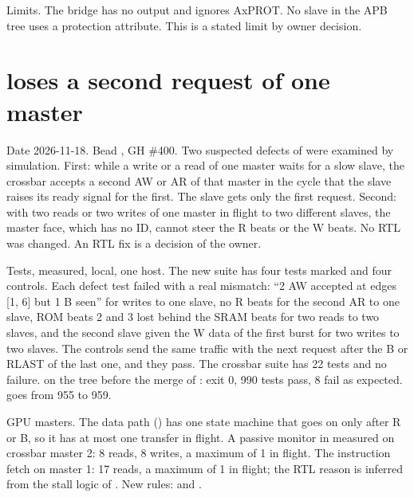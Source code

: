 \begin{record}

Limits. The bridge has no  output and ignores AxPROT. No slave in the APB tree uses a protection attribute. This is a stated limit by owner decision.

\end{record}

\section{ loses a second request of one master}\label{cr:defect:crossbar-second-request}

\begin{record}

Date 2026-11-18. Bead , GH \#400. Two suspected defects of  were examined by simulation. First: while a write or a read of one master waits for a slow slave, the crossbar accepts a second AW or AR of that master in the cycle that the slave raises its ready signal for the first. The slave gets only the first request. Second: with two reads or two writes of one master in flight to two different slaves, the master face, which has no ID, cannot steer the R beats or the W beats. No RTL was changed. An RTL fix is a decision of the owner.

\end{record}

\begin{record}

Tests, measured, local, one host. The new suite  has four tests marked  and four controls. Each defect test failed with a real mismatch: ``2 AW accepted at edges [1, 6] but 1 B seen'' for writes to one slave, no R beats for the second AR to one slave, ROM beats 2 and 3 lost behind the SRAM beats for two reads to two slaves, and the second slave given the W data of the first burst for two writes to two slaves. The controls send the same traffic with the next request after the B or RLAST of the last one, and they pass. The crossbar suite has 22 tests and no failure.  on the tree before the merge of : exit 0, 990 tests pass, 8 fail as expected.  goes from 955 to 959.

\end{record}

\begin{record}

GPU masters. The data path () has one state machine that goes on only after R or B, so it has at most one transfer in flight. A passive monitor in  measured on crossbar master 2: 8 reads, 8 writes, a maximum of 1 in flight. The instruction fetch on master 1: 17 reads, a maximum of 1 in flight; the RTL reason is inferred from the stall logic of . New rules:  and .

\end{record}

